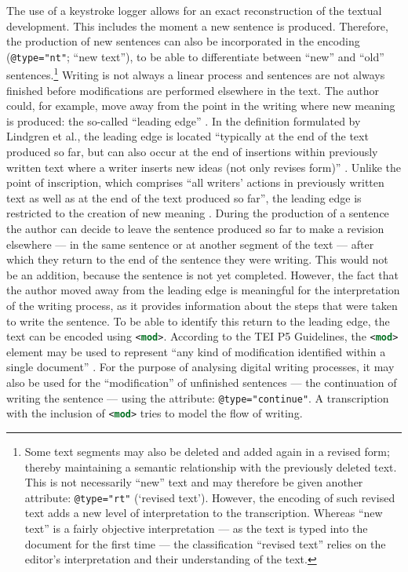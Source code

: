 \begin{paper}
The use of a keystroke logger allows for an exact reconstruction of the
textual development. This includes the moment a new sentence is
produced. Therefore, the production of new sentences can also be
incorporated in the encoding (\lstinline[language=XML]!@type="nt"!; ``new text''), to be able to
differentiate between ``new'' and ``old'' sentences.\footnote{Some text
  segments may also be deleted and added again in a revised form;
  thereby maintaining a semantic relationship with the previously
  deleted text. This is not necessarily ``new'' text and may therefore be
  given another attribute: \lstinline[language=XML]!@type="rt"! (`revised text'). However, the
  encoding of such revised text adds a new level of interpretation to
  the transcription. Whereas ``new text'' is a fairly objective
  interpretation --- as the text is typed into the document for the first
  time --- the classification ``revised text'' relies on the editor's
  interpretation and their understanding of the text.} Writing is not
always a linear process and sentences are not always finished before
modifications are performed elsewhere in the text. The author could, for
example, move away from the point in the writing where new meaning is
produced: the so-called ``leading edge'' \citep{lindgren_revising_2019}. In the
definition formulated by Lindgren et al., the leading edge is
located ``typically at the end of the text produced so far, but can also
occur at the end of insertions within previously written text where a
writer inserts new ideas (not only revises form)'' \citep[347]{lindgren_revising_2019}. Unlike the
point of inscription, which comprises ``all writers' actions in
previously written text as well as at the end of the text produced so
far'', the leading edge is restricted to the creation of new meaning
\citep[347]{lindgren_revising_2019}. During the production of a sentence the author can decide to
leave the sentence produced so far to make a revision elsewhere --- in
the same sentence or at another segment of the text --- after which they
return to the end of the sentence they were writing. This would not be
an addition, because the sentence is not yet completed. However, the
fact that the author moved away from the leading edge is meaningful for
the interpretation of the writing process, as it provides information
about the steps that were taken to write the sentence. To be able to
identify this return to the leading edge, the text can be encoded using
\lstinline[language=XML]!<mod>!. According to the TEI P5 Guidelines, the
\lstinline[language=XML]!<mod>! element may be used to represent ``any kind
of modification identified within a single document'' \citep[§11.3.4.1]{the_tei_consortium_tei_2020}. For
the purpose of analysing digital writing processes, it may also be used
for the ``modification'' of unfinished sentences --- the continuation of
writing the sentence --- using the attribute: \lstinline[language=XML]!@type="continue"!. A
transcription with the inclusion of \lstinline[language=XML]!<mod>! tries
to model the flow of writing.


\end{paper}
